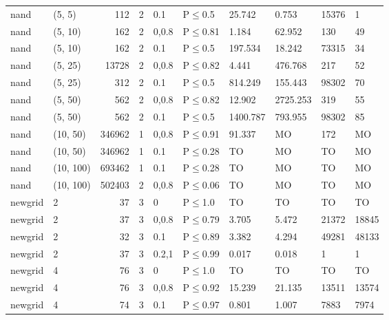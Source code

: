 \begin{longtable}{llrrllllll}
 nand          & (5, 5)    &    	112 &   2 & 0.1   & P$\leq$0.5   & 25.742   & 0.753    & 15376   & 1      \\
 nand          & (5, 10)   &    	162 &   2 & 0,0.8 & P$\leq$0.81  & 1.184    & 62.952   & 130     & 49     \\
 nand          & (5, 10)   &    	162 &   2 & 0.1   & P$\leq$0.5   & 197.534  & 18.242   & 73315   & 34     \\
 nand          & (5, 25)   &  	13728 &   2 & 0,0.8 & P$\leq$0.82  & 4.441    & 476.768  & 217     & 52     \\
 nand          & (5, 25)   &    	312 &   2 & 0.1   & P$\leq$0.5   & 814.249  & 155.443  & 98302   & 70     \\
 nand          & (5, 50)   &    	562 &   2 & 0,0.8 & P$\leq$0.82  & 12.902   & 2725.253 & 319     & 55     \\
 nand          & (5, 50)   &    	562 &   2 & 0.1   & P$\leq$0.5   & 1400.787 & 793.955  & 98302   & 85     \\
 nand          & (10, 50)  & 	346962 &   1 & 0,0.8 & P$\leq$0.91  & 91.337   & MO       & 172     & MO     \\
 nand          & (10, 50)  & 	346962 &   1 & 0.1   & P$\leq$0.28  & TO       & MO       & TO      & MO     \\
 nand          & (10, 100) & 	693462 &   1 & 0.1   & P$\leq$0.28  & TO       & MO       & TO      & MO     \\
 nand          & (10, 100) & 	502403 &   2 & 0,0.8 & P$\leq$0.06  & TO       & MO       & TO      & MO     \\
 newgrid       & 2         &     	37 &   3 & 0     & P$\leq$1.0   & TO       & TO       & TO      & TO     \\
 newgrid       & 2         &     	37 &   3 & 0,0.8 & P$\leq$0.79  & 3.705    & 5.472    & 21372   & 18845  \\
 newgrid       & 2         &     	32 &   3 & 0.1   & P$\leq$0.89  & 3.382    & 4.294    & 49281   & 48133  \\
 newgrid       & 2         &     	37 &   3 & 0.2,1 & P$\leq$0.99  & 0.017    & 0.018    & 1       & 1      \\
 newgrid       & 4         &     	76 &   3 & 0     & P$\leq$1.0   & TO       & TO       & TO      & TO     \\
 newgrid       & 4         &     	76 &   3 & 0,0.8 & P$\leq$0.92  & 15.239   & 21.135   & 13511   & 13574  \\
 newgrid       & 4         &     	74 &   3 & 0.1   & P$\leq$0.97  & 0.801    & 1.007    & 7883    & 7974   \\

\end{longtable}

